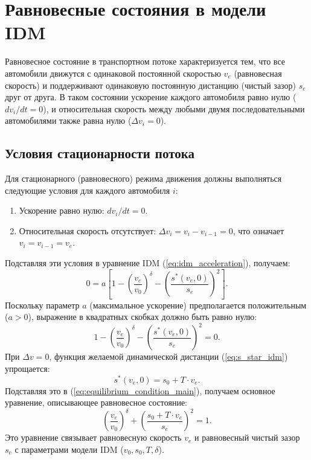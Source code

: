\documentclass[12pt, a4paper]{article}
\begin{document}
\section{Равновесные состояния в модели IDM}
\label{sec:equilibrium_states}

Равновесное состояние в транспортном потоке характеризуется тем, что все автомобили движутся с одинаковой постоянной скоростью $v_e$ (равновесная скорость) и поддерживают одинаковую постоянную дистанцию (чистый зазор) $s_e$ друг от друга. В таком состоянии ускорение каждого автомобиля равно нулю ($dv_i/dt = 0$), и относительная скорость между любыми двумя последовательными автомобилями также равна нулю ($\Delta v_i = 0$).

\subsection{Условия стационарности потока}
\label{subsec:equilibrium_conditions}

Для стационарного (равновесного) режима движения должны выполняться следующие условия для каждого автомобиля $i$:
\begin{enumerate}
    \item Ускорение равно нулю: $dv_i/dt = 0$.
    \item Относительная скорость отсутствует: $\Delta v_i = v_i - v_{i-1} = 0$, что означает $v_i = v_{i-1} = v_e$.
\end{enumerate}
Подставляя эти условия в уравнение IDM (\ref{eq:idm_acceleration}), получаем:
\begin{equation}
\label{eq:equilibrium_idm_raw}
0 = a \left[1 - \left(\frac{v_e}{v_0}\right)^\delta - \left( \frac{s^*(v_e, 0)}{s_e} \right)^2 \right].
\end{equation}
Поскольку параметр $a$ (максимальное ускорение) предполагается положительным ($a > 0$), выражение в квадратных скобках должно быть равно нулю:
\begin{equation}
\label{eq:equilibrium_condition_main}
1 - \left(\frac{v_e}{v_0}\right)^\delta - \left( \frac{s^*(v_e, 0)}{s_e} \right)^2 = 0.
\end{equation}
При $\Delta v = 0$, функция желаемой динамической дистанции (\ref{eq:s_star_idm}) упрощается:
\begin{equation}
\label{eq:s_star_equilibrium}
s^*(v_e, 0) = s_0 + T \cdot v_e.
\end{equation}
Подставляя это в (\ref{eq:equilibrium_condition_main}), получаем основное уравнение, описывающее равновесное состояние:
\begin{equation}
\label{eq:equilibrium_final_form}
\left(\frac{v_e}{v_0}\right)^\delta + \left( \frac{s_0 + T \cdot v_e}{s_e} \right)^2 = 1.
\end{equation}
Это уравнение связывает равновесную скорость $v_e$ и равновесный чистый зазор $s_e$ с параметрами модели IDM ($v_0, s_0, T, \delta$).
\end{document}
